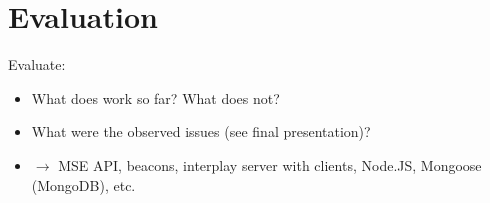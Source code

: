 \chapter{Evaluation}
\label{cha:evaluation}

Evaluate:
\begin{itemize}
    \item What does work so far? What does not?
    \item What were the observed issues (see final presentation)?
    \item $\rightarrow$ MSE API, beacons, interplay server with clients, Node.JS, Mongoose (MongoDB), etc.
\end{itemize}